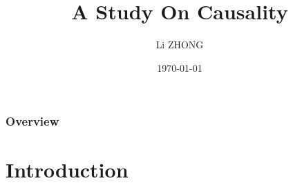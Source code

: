 \documentclass{beamer}
\title[]{A Study On Causality} %
\author{Li ZHONG} %
\institute[\'Ecole Polytechnique] %
{
Aldebaran Robotics \\ %
\medskip
\textit{lzhong@aldebaran-robotics.com} %
}
\date{\today} %
\begin{document}
\begin{frame}
\titlepage %
\end{frame}

\begin{frame}
\frametitle{Overview} %
\tableofcontents %
\end{frame}





\section{Introduction} %



\end{document}
